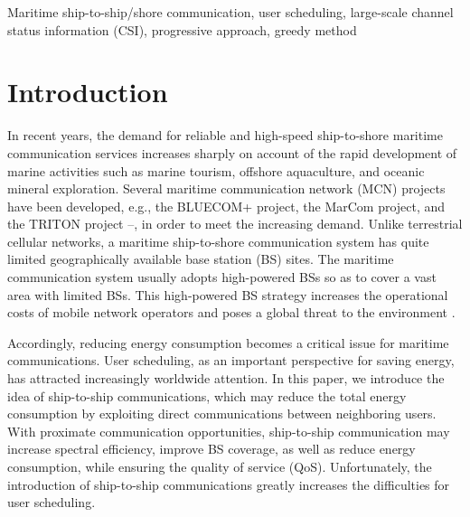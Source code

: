 \documentclass[conference]{IEEEtran}
\begin{document}
 \begin{IEEEkeywords}
 Maritime ship-to-ship/shore communication, user scheduling, large-scale channel status information (CSI), progressive approach, greedy method
 \end{IEEEkeywords}
 
 
 \maketitle
 
 \section{Introduction}\label{sec:1}
 In recent years, the demand for reliable and high-speed ship-to-shore maritime communication services increases sharply on account of the rapid development of marine activities such as marine tourism, offshore aquaculture, and oceanic mineral exploration. Several maritime communication network (MCN) projects have been developed, e.g., the BLUECOM+ project, the MarCom project, and the TRITON project \cite{p321}--\cite{p32}, in order to meet the increasing demand. 
 Unlike terrestrial cellular networks, a maritime ship-to-shore communication system has quite limited geographically available base station (BS) sites. The maritime communication system usually adopts high-powered BSs so as to cover a vast area with limited BSs. This high-powered BS strategy increases the operational costs of mobile network operators and poses a global threat to the environment \cite{p33}.
 
 Accordingly, reducing energy consumption becomes a critical issue for maritime communications. User scheduling, as an important perspective for saving energy, has attracted increasingly worldwide attention. 
 In this paper, we introduce the idea of ship-to-ship communications, which %
 may reduce the total energy consumption by exploiting direct communications between neighboring users. With proximate communication opportunities, ship-to-ship communication may increase spectral efficiency, improve BS coverage, as well as reduce energy consumption, while ensuring the quality of service (QoS). Unfortunately, the introduction of ship-to-ship communications greatly increases the difficulties for user scheduling. 
 
\end{document}
